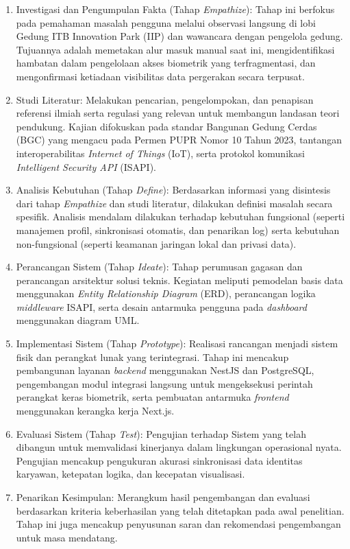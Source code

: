 \begin{enumerate}
    \item Investigasi dan Pengumpulan Fakta (Tahap \textit{Empathize}): Tahap ini berfokus pada pemahaman masalah pengguna melalui observasi langsung di lobi Gedung ITB Innovation Park (IIP) dan wawancara dengan pengelola gedung. Tujuannya adalah memetakan alur masuk manual saat ini, mengidentifikasi hambatan dalam pengelolaan akses biometrik yang terfragmentasi, dan mengonfirmasi ketiadaan visibilitas data pergerakan secara terpusat.
    \item Studi Literatur: Melakukan pencarian, pengelompokan, dan penapisan referensi ilmiah serta regulasi yang relevan untuk membangun landasan teori pendukung. Kajian difokuskan pada standar Bangunan Gedung Cerdas (BGC) yang mengacu pada Permen PUPR Nomor 10 Tahun 2023, tantangan interoperabilitas \textit{Internet of Things} (IoT), serta protokol komunikasi \textit{Intelligent Security API} (ISAPI).
    \item Analisis Kebutuhan (Tahap \textit{Define}): Berdasarkan informasi yang disintesis dari tahap \textit{Empathize} dan studi literatur, dilakukan definisi masalah secara spesifik. Analisis mendalam dilakukan terhadap kebutuhan fungsional (seperti manajemen profil, sinkronisasi otomatis, dan penarikan log) serta kebutuhan non-fungsional (seperti keamanan jaringan lokal dan privasi data).
    \item Perancangan Sistem (Tahap \textit{Ideate}): Tahap perumusan gagasan dan perancangan arsitektur solusi teknis. Kegiatan meliputi pemodelan basis data menggunakan \textit{Entity Relationship Diagram} (ERD), perancangan logika \textit{middleware} ISAPI, serta desain antarmuka pengguna pada \textit{dashboard} menggunakan diagram UML. 
    \item Implementasi Sistem (Tahap \textit{Prototype}): Realisasi rancangan menjadi sistem fisik dan perangkat lunak yang terintegrasi. Tahap ini mencakup pembangunan layanan \textit{backend} menggunakan NestJS dan PostgreSQL, pengembangan modul integrasi langsung untuk mengeksekusi perintah perangkat keras biometrik, serta pembuatan antarmuka \textit{frontend} menggunakan kerangka kerja Next.js.
    \item Evaluasi Sistem (Tahap \textit{Test}): Pengujian terhadap Sistem yang telah dibangun untuk memvalidasi kinerjanya dalam lingkungan operasional nyata. Pengujian mencakup pengukuran akurasi sinkronisasi data identitas karyawan, ketepatan logika, dan kecepatan visualisasi. 
    \item Penarikan Kesimpulan: Merangkum hasil pengembangan dan evaluasi berdasarkan kriteria keberhasilan yang telah ditetapkan pada awal penelitian. Tahap ini juga mencakup penyusunan saran dan rekomendasi pengembangan untuk masa mendatang.
\end{enumerate}

